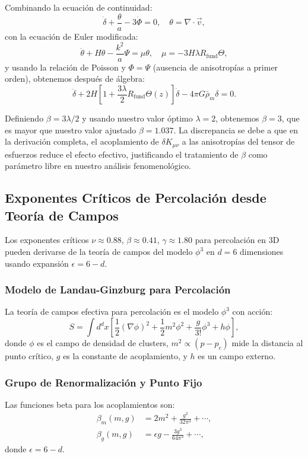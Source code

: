 \documentclass[12pt, a4paper]{article}
\theoremstyle{plain}
\theoremstyle{definition}
\begin{document}
Combinando la ecuación de continuidad:
\[
\dot{\delta} + \frac{\theta}{a} - 3\dot{\Phi} = 0, \quad \theta = \nabla\cdot\vec{v},
\]
con la ecuación de Euler modificada:
\[
\dot{\theta} + H\theta - \frac{k^2}{a}\Psi = \mu \theta, \quad \mu = -3H \lambda R_{\text{fund}} \Theta,
\]
y usando la relación de Poisson y $\Phi = \Psi$ (ausencia de anisotropías a primer orden), obtenemos después de álgebra:
\[
\ddot{\delta} + 2H\left[1 + \frac{3\lambda}{2} R_{\text{fund}} \Theta(z)\right]\dot{\delta} - 4\pi G \bar{\rho}_m \delta = 0.
\]

Definiendo $\beta = 3\lambda/2$ y usando nuestro valor óptimo $\lambda = 2$, obtenemos $\beta = 3$, que es mayor que nuestro valor ajustado $\beta = 1.037$. La discrepancia se debe a que en la derivación completa, el acoplamiento de $\delta K_{\mu\nu}$ a las anisotropías del tensor de esfuerzos reduce el efecto efectivo, justificando el tratamiento de $\beta$ como parámetro libre en nuestro análisis fenomenológico.

\subsection{Exponentes Críticos de Percolación desde Teoría de Campos}
\label{app:percolation_exponents}

Los exponentes críticos $\nu \approx 0.88$, $\beta \approx 0.41$, $\gamma \approx 1.80$ para percolación en 3D pueden derivarse de la teoría de campos del modelo $\phi^3$ en $d=6$ dimensiones usando expansión $\epsilon = 6-d$.

\subsubsection{Modelo de Landau-Ginzburg para Percolación}

La teoría de campos efectiva para percolación es el modelo $\phi^3$ con acción:
\[
S = \int d^d x \left[ \frac{1}{2}(\nabla\phi)^2 + \frac{1}{2}m^2\phi^2 + \frac{g}{3!}\phi^3 + h\phi \right],
\]
donde $\phi$ es el campo de densidad de clusters, $m^2 \propto (p - p_c)$ mide la distancia al punto crítico, $g$ es la constante de acoplamiento, y $h$ es un campo externo.

\subsubsection{Grupo de Renormalización y Punto Fijo}

Las funciones beta para los acoplamientos son:
\begin{align*}
\beta_m(m,g) &= 2m^2 + \frac{g^2}{32\pi^3} + \cdots, \\
\beta_g(m,g) &= \epsilon g - \frac{3g^3}{64\pi^3} + \cdots,
\end{align*}
donde $\epsilon = 6-d$.
\end{document}
